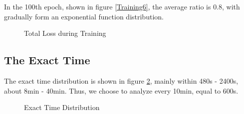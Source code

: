 \documentclass[fontset=none]{ctexart}
\theoremstyle{definition}
\theoremstyle{remark}
\begin{document}
            In the 100th epoch, shown in figure \ref{Training6}, the average ratio is 0.8, with gradually form an exponential function distribution.

            \begin{figure}[H]
                \centering
                \quad
                \newline
                \quad
                \newline
                \quad
                \newline
                \caption{Total Loss during Training}
                \label{Training}
            \end{figure}

        \subsection{The Exact Time}

            The exact time distribution is shown in figure \ref{Distribution}, mainly within 480s - 2400s, about 8min - 40min. Thus, we choose to analyze every 10min, equal to 600s.

            \begin{figure}[H]
                \centering
                \quad
                \newline
                \caption{Exact Time Distribution}
                \label{Distribution}
            \end{figure}
\end{document}
